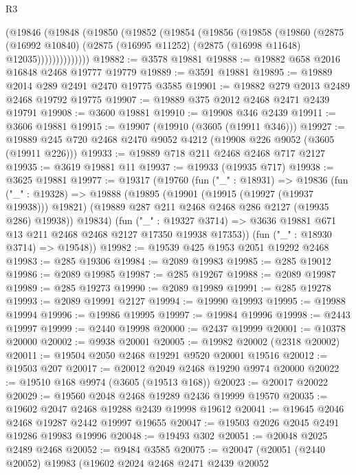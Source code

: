 \begin{lexlean}{R3}
\begin{coremodule}
          (@19846
            (@19848
              (@19850
                (@19852
                  (@19854
                    (@19856
                      (@19858
                        (@19860
                          (@2875
                            (@16992 @10840)
                            (@2875 (@16995 @11252) (@2875 (@16998 @11648) @12035))))))))))))))
@19882 := @3578 @19881
@19888 := @19882 @658 @2016 @16848 @2468 @19777 @19779
@19889 := @3591 @19881
@19895 := @19889 @2014 @289 @2491 @2470 @19775 @3585
@19901 := @19882 @279 @2013 @2489 @2468 @19792 @19775
@19907 := @19889 @375 @2012 @2468 @2471 @2439 @19791
@19908 := @3600 @19881
@19910 := @19908 @346 @2439
@19911 := @3606 @19881
@19915 := @19907 (@19910 (@3605 (@19911 @346)))
@19927 := @19889 @245 @720 @2468 @2470 @9052 @4212 (@19908 @226 @9052 (@3605 (@19911 @226)))
@19933 := @19889 @718 @211 @2468 @2468 @717 @2127
@19935 := @3619 @19881 @11
@19937 := @19933 (@19935 @717)
@19938 := @3625 @19881
@19977 := @19317
    (@19760
      (fun ("_" : @18931) =>
      @19836
        (fun ("_" : @19328) =>
        @19888
          (@19895
            (@19901 (@19915 (@19927 (@19937 @19938))) @19821)
            (@19889 @287 @211 @2468 @2468 @286 @2127 (@19935 @286) @19938))
          @19834)
        (fun ("_" : @19327 @3714) =>
        @3636 @19881 @671 @13 @211 @2468 @2468 @2127 @17350 @19938 @17353))
      (fun ("_" : @18930 @3714) => @19548))
@19982 := @19539 @425 @1953 @2051 @19292 @2468
@19983 := @285 @19306
@19984 := @2089 @19983
@19985 := @285 @19012
@19986 := @2089 @19985
@19987 := @285 @19267
@19988 := @2089 @19987
@19989 := @285 @19273
@19990 := @2089 @19989
@19991 := @285 @19278
@19993 := @2089 @19991 @2127
@19994 := @19990 @19993
@19995 := @19988 @19994
@19996 := @19986 @19995
@19997 := @19984 @19996
@19998 := @2443 @19997
@19999 := @2440 @19998
@20000 := @2437 @19999
@20001 := @10378 @20000
@20002 := @9938 @20001
@20005 := @19982 @20002 (@2318 @20002)
@20011 := @19504 @2050 @2468 @19291 @9520 @20001 @19516
@20012 := @19503 @207
@20017 := @20012 @2049 @2468 @19290 @9974 @20000
@20022 := @19510 @168 @9974 (@3605 (@19513 @168))
@20023 := @20017 @20022
@20029 := @19560 @2048 @2468 @19289 @2436 @19999 @19570
@20035 := @19602 @2047 @2468 @19288 @2439 @19998 @19612
@20041 := @19645 @2046 @2468 @19287 @2442 @19997 @19655
@20047 := @19503 @2026 @2045 @2491 @19286 @19983 @19996
@20048 := @19493 @302
@20051 := @20048 @2025 @2489 @2468
@20052 := @9484 @3585
@20075 := @20047
    (@20051
      (@2440 @20052)
      @19983
      (@19602
        @2024
        @2468
        @2471
        @2439
        @20052

\end{coremodule}
\end{lexlean}
